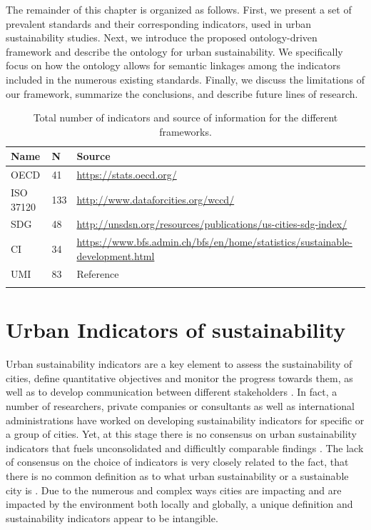 \documentclass[preprint,12pt]{elsarticle}
\begin{document}
The remainder of this chapter is organized as follows. First, we present a set of prevalent standards and their corresponding indicators, used in urban sustainability studies. Next, we introduce the proposed ontology-driven framework and describe the ontology for urban sustainability. We specifically focus on how the ontology allows for semantic linkages among the indicators included in the numerous existing standards. Finally, we discuss the limitations of our framework, summarize the conclusions, and describe future lines of research.
 \begin{table}[t!]
 \caption{Total number of indicators and source of information for the different frameworks.}
     \begin{tabular}{ | p{2.3cm}| p{1cm} |  p{9.3cm} |}
  \hline
  Name & N & Source\\
   \hline 
   \hline
  OECD & 41 & \url{https://stats.oecd.org/} \\
   \hline
  ISO 37120 & 133 & \url{http://www.dataforcities.org/wccd/} \\
     \hline
  SDG  & 48 & \url{http://unsdsn.org/resources/publications/us-cities-sdg-index/} \\
       \hline
   CI  & 34 & \url{https://www.bfs.admin.ch/bfs/en/home/statistics/sustainable-development.html} \\
       \hline
 UMI  & 83 & Reference \cite{kennedy2014developing} \\
  \hline  
 \label{tab:numberIndicators}
\end{tabular}
 \end{table}
 
\section{Urban Indicators of sustainability}
\label{sec:UIS}
Urban sustainability indicators are a key element to assess the sustainability of cities, define quantitative objectives and monitor the progress towards them, as well as to develop communication between different stakeholders \cite{SHEN201117}. In fact, a number of researchers, private companies or consultants as well as international administrations have worked on developing sustainability indicators for specific or a group of cities. Yet, at this stage there is no consensus on urban sustainability indicators that fuels unconsolidated and difficultly comparable findings \cite{kahn2007green}. The lack of consensus on the choice of indicators is very closely related to the fact, that there is no common definition as to what urban sustainability or a sustainable city is \cite{alberti1996measuring}. Due to the numerous and complex ways cities are impacting and are impacted by the environment both locally and globally, a unique definition and sustainability indicators appear to be intangible.
\end{document}
